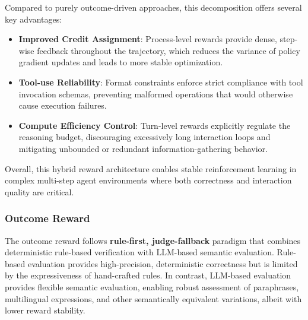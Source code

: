 \documentclass{huawei}
\begin{document}
Compared to purely outcome-driven approaches, this decomposition offers several key advantages:
\begin{itemize}[leftmargin=1em, listparindent=\parindent]
\item \textbf{Improved Credit Assignment}: Process-level rewards provide dense, step-wise feedback throughout the trajectory, which reduces the variance of policy gradient updates and leads to more stable optimization.

\item \textbf{Tool-use Reliability}: Format constraints enforce strict compliance with tool invocation schemas, preventing malformed operations that would otherwise cause execution failures.

\item \textbf{Compute Efficiency Control}: Turn-level rewards explicitly regulate the reasoning budget, discouraging excessively long interaction loops and mitigating unbounded or redundant information-gathering behavior.
\end{itemize}

Overall, this hybrid reward architecture enables stable reinforcement learning in complex multi-step agent environments where both correctness and interaction quality are critical.


\subsubsection{Outcome Reward}
The outcome reward follows \textbf{rule-first, judge-fallback} paradigm that combines deterministic rule-based verification with LLM-based semantic evaluation. Rule-based evaluation provides high-precision, deterministic correctness but is limited by the expressiveness of hand-crafted rules. In contrast, LLM-based evaluation provides flexible semantic evaluation, enabling robust assessment of paraphrases, multilingual expressions, and other semantically equivalent variations, albeit with lower reward stability.
\end{document}
